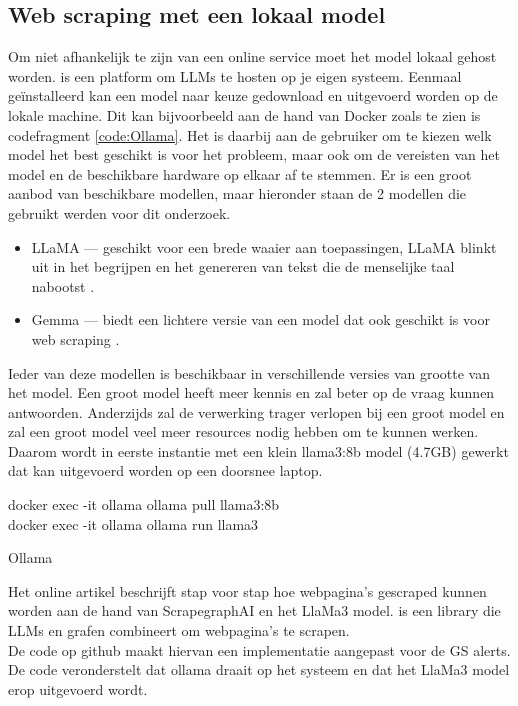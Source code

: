 \subsection{Web scraping met een lokaal model}
Om niet afhankelijk te zijn van een online service moet het model lokaal gehost worden. \textcite{Ollama2025} is een platform om LLMs te hosten op je eigen systeem. Eenmaal geïnstalleerd kan een model naar keuze gedownload en uitgevoerd worden op de lokale machine.
Dit kan bijvoorbeeld aan de hand van Docker zoals te zien is codefragment \ref{code:Ollama}. Het is daarbij aan de gebruiker om te kiezen welk model het best geschikt is voor het probleem, maar ook om de vereisten van het model en de beschikbare hardware op elkaar af te stemmen. Er is een groot aanbod van beschikbare modellen, maar hieronder staan de 2 modellen die gebruikt werden voor dit onderzoek.
\begin{itemize}
    \item LLaMA — geschikt voor een brede waaier aan toepassingen, LLaMA blinkt uit in het begrijpen en het genereren van tekst die de menselijke taal nabootst \autocite{Llama32025}.
    \item Gemma — biedt een lichtere versie van een model dat ook geschikt is voor web scraping \autocite{Gemma32025}.
\end{itemize}
Ieder van deze modellen is beschikbaar in verschillende versies van grootte van het model. Een groot model heeft meer kennis en zal beter op de vraag kunnen antwoorden. Anderzijds zal de verwerking trager verlopen bij een groot model en zal een groot model veel meer resources nodig hebben om te kunnen werken.
Daarom wordt in eerste instantie met een klein llama3:8b model (4.7GB) gewerkt dat kan uitgevoerd worden op een doorsnee laptop.
\begin{listing}
    docker exec -it ollama ollama pull llama3:8b\\
    docker exec -it ollama ollama run llama3
    \caption[Ollama]{Ollama}
    \label{code:Ollama}
\end{listing}
Het online artikel \textcite{Scrapegraphaillama2025} beschrijft stap voor stap hoe webpagina's gescraped kunnen worden aan de hand van ScrapegraphAI en het LlaMa3 model.
\textcite{ScrapeGraphAI2025} is een library die LLMs en grafen combineert om webpagina's te scrapen.\\
De code op github \textcite{Depaepeollama2025} maakt hiervan een implementatie aangepast voor de GS alerts. De code veronderstelt dat ollama draait op het systeem en dat het LlaMa3 model erop uitgevoerd wordt.
